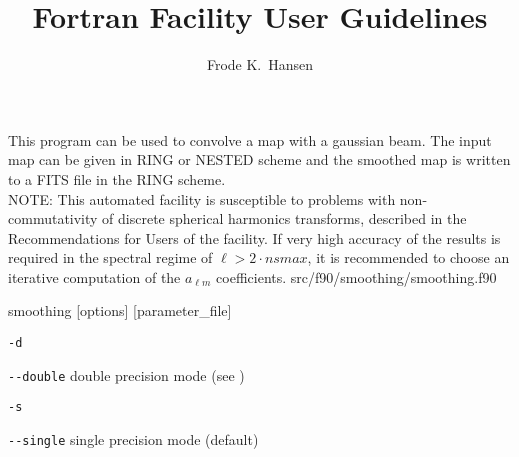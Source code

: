 
\sloppy


\title{\healpix Fortran Facility User Guidelines}
 \section[smoothing]{\nosectionname}
\label{fac:smoothing}
\author{Frode K.~Hansen}

\begin{facility}
{This program can be used to convolve a map with a gaussian beam. 
The input map can be given in RING or NESTED scheme and the smoothed map 
is written 
to a FITS file in the RING scheme.%
\\%
NOTE: This automated facility is susceptible to problems with non-commutativity
of discrete spherical harmonics transforms, described in the Recommendations
for Users of the  facility. 
If very high accuracy of the results is
required in the spectral regime of $\ell > 2\cdot nsmax$, it is recommended
to choose an iterative computation of the $a_{\ell m}$ coefficients.
} 
{src/f90/smoothing/smoothing.f90}
\end{facility}

\begin{f90facility}
{smoothing [options] [parameter\_file]}
\end{f90facility}


\begin{options}
  \begin{optionlistwide}{} %
    \item[{\tt -d}]
    \item[{\tt -}{\tt -}{\tt double}] double precision mode (see 
)
    \item[{\tt -s}]
    \item[{\tt -}{\tt -}{\tt single}] single precision mode (default)
  \end{optionlistwide}
\end{options}


